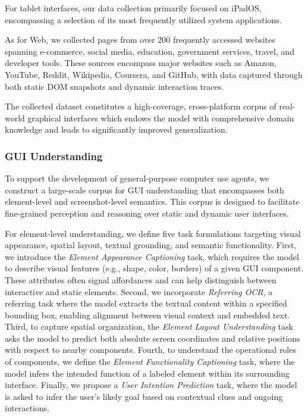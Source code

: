 For tablet interfaces, our data collection primarily focused on iPadOS, encompassing a selection of its most frequently utilized system applications.

As for Web, we collected pages from over 200 frequently accessed websites spanning e-commerce, social media, education, government services, travel, and developer tools. These sources encompass major websites such as Amazon, YouTube, Reddit, Wikipedia, Coursera, and GitHub, with data captured through both static DOM snapshots and dynamic interaction traces.

The collected dataset constitutes a high-coverage, cross-platform corpus of real-world graphical interfaces which endows the model with comprehensive domain knowledge and leads to significantly improved generalization.

\subsubsection{GUI Understanding}
To support the development of general-purpose computer use agents, we construct a large-scale corpus for GUI understanding that encompasses both element-level and screenshot-level semantics. This corpus is designed to facilitate fine-grained perception and reasoning over static and dynamic user interfaces.

For element-level understanding, we define five task formulations targeting visual appearance, spatial layout, textual grounding, and semantic functionality. First, we introduce the \textit{Element Appearance Captioning} task, which requires the model to describe visual features (e.g., shape, color, borders) of a given GUI component. These attributes often signal affordances and can help distinguish between interactive and static elements. Second, we incorporate \textit{Referring OCR}, a referring task where the model extracts the textual content within a specified bounding box, enabling alignment between visual context and embedded text. Third, to capture spatial organization, the \textit{Element Layout Understanding} task asks the model to predict both absolute screen coordinates and relative positions with respect to nearby components. Fourth, to understand the operational roles of components, we define the \textit{Element Functionality Captioning} task, where the model infers the intended function of a labeled element within its surrounding interface. Finally, we propose a \textit{User Intention Prediction} task, where the model is asked to infer the user's likely goal based on contextual clues and ongoing interactions.

